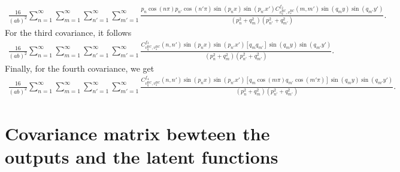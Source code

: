 \documentclass[a4paper,10pt]{article}
\begin{document}
\begin{align*}   
\frac{16}{(ab)^2}\sum_{n=1}^\infty\sum_{m=1}^\infty \sum_{n'=1}^\infty
\sum_{m'=1}^\infty\frac{p_n \cos(n\pi)p_{n'}\cos(n'\pi)\sin\left(p_n x\right)\sin\left(p_{n'} x'\right)
      C^{f_2}_{v^{\text{BC}}_q,v^{\text{BC}}_s}(m,m')\sin\left(q_m y\right)\sin\left(q_{m'} y'\right)}
    {(p_n^2 + q_m^2)(p_{n'}^2 + q_{m'}^2)}.
\end{align*}
For the third covariance, it follows
\begin{align*}   
\frac{16}{(ab)^2}\sum_{n=1}^\infty\sum_{m=1}^\infty \sum_{n'=1}^\infty
\sum_{m'=1}^\infty\frac{C^{f_3}_{v^{\text{BC}}_q,v^{\text{BC}}_s}(n,n')\sin\left(p_n x\right)\sin\left(p_{n'} x'\right)
    [q_m q_{m'}]\sin\left(q_m y\right)\sin\left(q_{m'} y'\right)}
    {(p_n^2 + q_m^2)(p_{n'}^2 + q_{m'}^2)}.
\end{align*}
Finally, for the fourth covariance, we get
\begin{align*}   
\frac{16}{(ab)^2}\sum_{n=1}^\infty\sum_{m=1}^\infty \sum_{n'=1}^\infty
\sum_{m'=1}^\infty\frac{C^{f_4}_{v^{\text{BC}}_q,v^{\text{BC}}_s}(n,n')\sin\left(p_n x\right)\sin\left(p_{n'} x'\right)
      [q_m \cos(m\pi)q_{m'}\cos(m'\pi)]\sin\left(q_m y\right)\sin\left(q_{m'} y'\right)}
    {(p_n^2 + q_m^2)(p_{n'}^2 + q_{m'}^2)}.
\end{align*}


\section{Covariance matrix bewteen the outputs and the latent functions}
\end{document}
